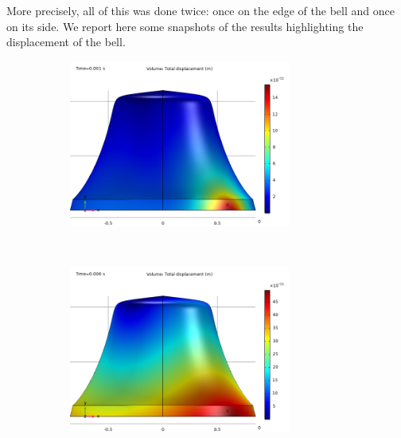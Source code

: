 \documentclass[a4paper]{article}
\begin{document}
More precisely, all of this was done twice: once on the edge of the bell and once on its side. We report here some snapshots of the results highlighting the displacement of the bell. 

\begin{figure}[h!]
	\centering
	\begin{subfigure}{0.47\textwidth}
		\includegraphics[width=0.8\textwidth]{time domain study edge/initial time.png}
	\end{subfigure}
	~
	\begin{subfigure}{0.47\textwidth}
		\includegraphics[width=0.8\textwidth]{time domain study edge/initial time 2.png}
	\end{subfigure}


\end{figure}
\end{document}
